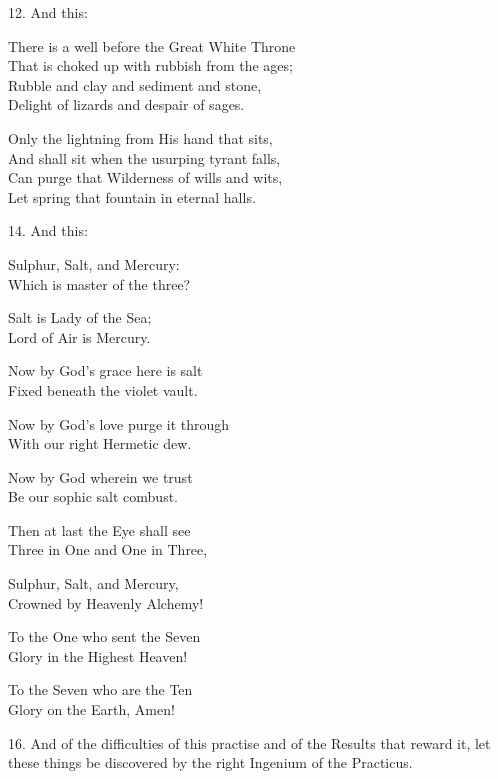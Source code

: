 12. And this:
\begin{tightverse}
 There is a well before the Great White Throne \\
That is choked up with rubbish from the ages; \\
Rubble and clay and sediment and stone, \\
Delight of lizards and despair of sages. 

Only the lightning from His hand that sits, \\
And shall sit when the usurping tyrant falls, \\
Can purge that Wilderness of wills and wits, \\
Let spring that fountain in eternal halls. \\
\end{tightverse}

14. And this:
\begin{tightverse}
 Sulphur, Salt, and Mercury: \\
 Which is master of the three? 

 Salt is Lady of the Sea; \\
 Lord of Air is Mercury. 

 Now by God’s grace here is salt \\
 Fixed beneath the violet vault. 

 Now by God’s love purge it through \\
 With our right Hermetic dew. 

 Now by God wherein we trust \\
 Be our sophic salt combust. 
 
 Then at last the Eye shall see \\
 Three in One and One in Three, 

 Sulphur, Salt, and Mercury, \\
 Crowned by Heavenly Alchemy! 

 To the One who sent the Seven \\
 Glory in the Highest Heaven!  

 To the Seven who are the Ten \\
 Glory on the Earth, Amen! 
\end{tightverse}

16. And of the difficulties of this practise and of the Results that reward it, let these things be discovered by the right Ingenium of the Practicus.

